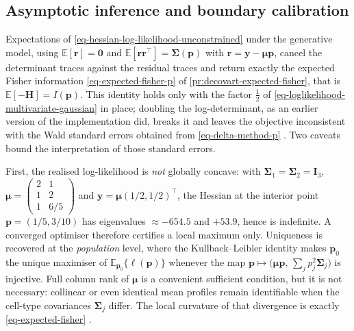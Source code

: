 \documentclass[pdflatex, sn-nature]{sn-jnl}
\theoremstyle{thmstyleone}%
\theoremstyle{thmstyletwo}%
\theoremstyle{thmstylethree}%
\begin{document}
\begin{appendices}
        \subsection{Asymptotic inference and boundary calibration}
        \label{subsec:asymptotic-inference}

        Expectations of \ref{eq-hessian-log-likelihood-unconstrained} under the
        generative model, using $\mathbb{E}[\boldsymbol{r}]=\boldsymbol{0}$ and
        $\mathbb{E}[\boldsymbol{r}\boldsymbol{r}^{\top}]=\boldsymbol{\Sigma}(
        \boldsymbol{p})$ with $\boldsymbol{r}=\boldsymbol{y}-\boldsymbol{\mu}
        \boldsymbol{p}$, cancel the determinant traces against the residual
        traces and return exactly the expected Fisher information
        \ref{eq-expected-fisher-p} of \ref{pr:decovart-expected-fisher}, that is
        $\mathbb{E}[-\mathbf{H}]=I(\boldsymbol{p})$. This identity holds only
        with the factor $\frac{1}{2}$ of
        \ref{eq-loglikelihood-multivariate-gaussian} in place; doubling the
        log-determinant, as an earlier version of the implementation did, breaks
        it and leaves the objective inconsistent with the Wald standard errors
        obtained from \ref{eq-delta-method-p}
        \cite{oehlertNoteDeltaMethod1992}. Two caveats bound the interpretation
        of those standard errors.

        First, the realised log-likelihood is \textit{not} globally concave: with
        $\boldsymbol{\Sigma}_{1}=\boldsymbol{\Sigma}_{2}=\mathbf{I}_{3}$,
        $\boldsymbol{\mu}=\left(\begin{smallmatrix} 2 & 1 \\ 1 & 2 \\ 1 & 6/5
        \end{smallmatrix}\right)$ and $\boldsymbol{y}=\boldsymbol{\mu}(1/2,1/2)^{\top}$,
        the Hessian at the interior point $\boldsymbol{p}=(1/5,3/10)$ has
        eigenvalues $\approx-654.5$ and $+53.9$, hence is indefinite. A converged
        optimiser therefore certifies a local maximum only. Uniqueness is
        recovered at the \textit{population} level, where the Kullback--Leibler
        identity makes $\boldsymbol{p}_{0}$ the unique maximiser of
        $\mathbb{E}_{\boldsymbol{p}_{0}}\{\ell(\boldsymbol{p})\}$ whenever the
        map
        $\boldsymbol{p}\mapsto
        \bigl(\boldsymbol{\mu}\boldsymbol{p},\,
        \sum_{j}p_{j}^{2}\boldsymbol{\Sigma}_{j}\bigr)$
        is injective. Full column rank of $\boldsymbol{\mu}$ is a convenient
        sufficient condition, but it is not necessary: collinear or even
        identical mean profiles remain identifiable when the cell-type
        covariances $\boldsymbol{\Sigma}_{j}$ differ. The local curvature of
        that divergence is exactly \ref{eq-expected-fisher}
        \cite{vaartAsymptoticStatistics2000}.


\end{appendices}
\end{document}
